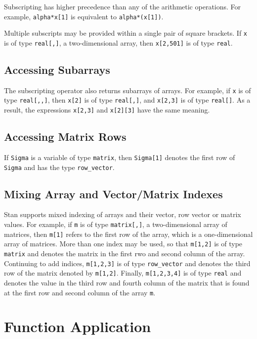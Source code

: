 \documentclass[10pt]{report}
\newcommand{\Stan}{Stan\xspace}
\newcommand{\code}[1]{{\tt #1}}
\begin{document}
Subscripting has higher precedence than any of the arithmetic
operations.  For example, \code{alpha*x[1]} is equivalent to
\code{alpha*(x[1])}.  

Multiple subscripts may be provided within a single pair of square
brackets.  If \code{x} is of type \code{real[,]}, a two-dimensional
array, then \code{x[2,501]} is of type \code{real}.

\subsection{Accessing Subarrays}

The subscripting operator also returns subarrays of arrays.  For
example, if \code{x} is of type \code{real[,,]}, then \code{x[2]}
is of type \code{real[,]}, and \code{x[2,3]} is of type
\code{real[]}.  As a result, the expressions \code{x[2,3]} and
\code{x[2][3]} have the same meaning.  

\subsection{Accessing Matrix Rows}

If \code{Sigma} is a variable of type \code{matrix}, then
\code{Sigma[1]} denotes the first row of \code{Sigma} and has the
type \code{row\_vector}.  

\subsection{Mixing Array and Vector/Matrix Indexes}

\Stan supports mixed indexing of arrays and their vector, row vector
or matrix values.  For example, if \code{m} is of type
\code{matrix[,]}, a two-dimensional array of matrices, then
\code{m[1]} refers to the first row of the array, which is a
one-dimensional array of matrices.  More than one index may be used,
so that \code{m[1,2]} is of type \code{matrix} and denotes the matrix
in the first rwo and second column of the array.  Continuing to add
indices, \code{m[1,2,3]} is of type \code{row\_vector} and denotes
the third row of the matrix denoted by \code{m[1,2]}.  Finally,
\code{m[1,2,3,4]} is of type \code{real} and denotes the value in the
third row and fourth column of the matrix that is found at the first
row and second column of the array \code{m}.

\section{Function Application}
\end{document}
